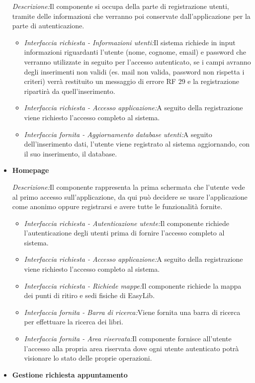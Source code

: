 \documentclass{article}
\begin{document}
\begin{itemize}
    \textit{Descrizione:}Il componente si occupa della parte di registrazione  utenti, tramite delle informazioni che verranno poi conservate dall’applicazione per la parte di autenticazione.\\
    \begin{itemize}
        \item \textit{Interfaccia richiesta - Informazioni utenti:}Il sistema richiede in input informazioni riguardanti l’utente (nome, cognome, email) e password che verranno utilizzate in seguito per l’accesso autenticato, se i campi avranno degli inserimenti non validi (es. mail non valida, password non rispetta i criteri) verrà restituito un messaggio di errore RF 29 e la registrazione ripartirà da quell’inserimento.
        \item \textit{Interfaccia richiesta - Accesso applicazione:}A seguito della registrazione viene richiesto l’accesso completo al sistema.
        \item \textit{Interfaccia fornita - Aggiornamento database utenti:}A seguito dell’inserimento dati, l’utente viene registrato al sistema aggiornando, con il suo inserimento, il database.
    \end{itemize}
    \item \textbf{Homepage}
    
    \textit{Descrizione:}Il componente rappresenta la prima schermata che l’utente vede al primo accesso sull’applicazione, da qui può decidere se usare l’applicazione come anonimo oppure registrarsi e avere tutte le funzionalità fornite.
    
    \begin{itemize}
        \item \textit{Interfaccia richiesta - Autenticazione utente:}Il componente richiede l’autenticazione degli utenti prima di fornire l’accesso completo al sistema.
        \item \textit{Interfaccia richiesta - Accesso applicazione:}A seguito della registrazione viene richiesto l’accesso completo al sistema.
        \item \textit{Interfaccia richiesta - Richiede mappe:}Il componente richiede la mappa dei punti di ritiro e sedi fisiche di EasyLib.
        \item \textit{Interfaccia fornita - Barra  di ricerca:}Viene fornita una barra di ricerca per effettuare la ricerca dei libri.
        \item \textit{Interfaccia fornita - Area riservata:}Il componente fornisce all’utente l’accesso alla propria area riservata dove ogni utente autenticato potrà visionare lo stato delle proprie operazioni.
    \end{itemize}
    \item \textbf{Gestione richiesta appuntamento}
    

\end{itemize}
\end{document}
